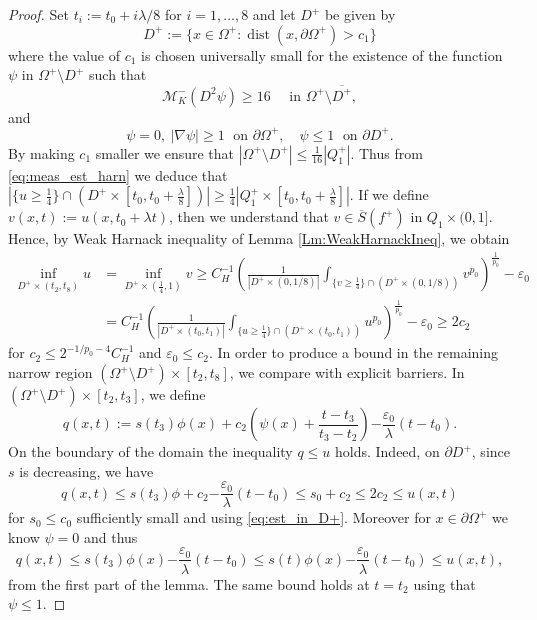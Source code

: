 \documentclass[12pt]{article}
\numberwithin{Theorem}{section}
\theoremstyle{definition}
\theoremstyle{remark}
\numberwithin{equation}{section}
\newcommand{\p}{\partial}
\newcommand{\eps}{\varepsilon}
\begin{document}
\begin{proof}
Set \(t_i:=t_0+i\lambda/8\) for \(i=1,\dots,8\) and let $D^+$ be given by  
\[ 
D^+:= \{ x \in \Omega^+ : \operatorname{dist}(x,\p \Omega^+) > c_1\} 
\]
 where the value of $c_1$ is chosen universally small for the existence of the function $\psi$ in $\Omega^+ \setminus D^+$ such that 
 \[
    \mathcal M_K^- (D^2 \psi) \geq 16 \quad \text{ in }\Omega^+ \setminus \overline{D^+}, 
 \]
and
\[
\psi= 0, \ |\nabla \psi| \geq 1 \; \text{ on } \p \Omega^+, \quad \psi\leq 1 \; \text{ on } \p D^+.
\]
 By making $c_1$ smaller we ensure that $|\Omega^+\setminus D^+| \leq \frac{1}{16}|Q_1^+|$. Thus from \eqref{eq:meas_est_harn} we deduce that $\left|\{ u \geq \frac{1}{4}\}\cap ( D^+  \times \left[t_0, t_0+\frac{\lambda}{8} \right] ) \right| \geq \frac{1}{4} \left| Q_1^+ \times \left[t_0, t_0+\frac{\lambda}{8} \right] \right|$. 
If we define $v(x,t):=u(x,t_0+\lambda t)$, then we understand that $v \in \overline{S}(f^+)$ in $Q_1 \times (0,1]$. Hence, by Weak Harnack inequality of Lemma \ref{Lm:WeakHarnackIneq}, we obtain
\begin{equation} \label{eq:est_in_D+}
\begin{aligned}
    \inf_{D^+ \times (t_2,t_8)} u &=   \inf_{D^+ \times (\frac{1}{4},1)} v \geq C_H^{-1} \left(\frac{1}{|D^+\times(0,1/8)|} \int_{\{ v \geq \frac{1}{4}\} \cap  \left(D^+\times(0,1/8) \right)} v^{p_0}\right)^\frac{1}{p_0} -\eps_0\\ &=C_H^{-1} \left(\frac{1}{|D^+\times(t_0,t_1)|}\int_{\{ u \geq \frac{1}{4}\} \cap  \left(D^+ \times(t_0,t_1) \right)} u^{p_0}\right)^\frac{1}{p_0} -\eps_0 \geq 2c_2
    \end{aligned}
    \end{equation}
for $c_2 \leq 2^{-1/p_0-4}C_H^{-1}$ and $\eps_0\leq c_2$. In order to produce a bound in the remaining narrow region $(\Omega^+ \setminus D^+) \times [t_2,t_8]$, we compare with explicit barriers. In  $(\Omega^+ \setminus D^+) \times [t_2,t_3]$, we define
\[
q(x,t):= s(t_3) \phi(x) + c_2 \left( \psi(x) + \frac{t-t_3}{t_3-t_2}\right) {-\frac{\eps_0}{\lambda}(t-t_0)}.  
\]
On the boundary of the domain the inequality $q \leq u$ holds. Indeed, on $\p D^+$, since $s$ is decreasing, we have 
\[
q(x,t) \leq s(t_3) \phi + c_2 {-\frac{\eps_0}{\lambda}(t-t_0)}\leq s_0+c_2 \leq 2c_2 \leq u(x,t)
\]
for $s_0 \leq c_0$ sufficiently small and using \eqref{eq:est_in_D+}. Moreover for $x \in \p \Omega^+$ we know $\psi = 0$ and thus
\[
q(x,t) \leq s(t_3) \phi(x)  {-\frac{\eps_0}{\lambda}(t-t_0)} \leq s(t) \phi(x) {-\frac{\eps_0}{\lambda}(t-t_0)}\leq u(x,t),
\]
from the first part of the lemma. The same bound holds at $t=t_2$ using that $\psi \leq 1$.

\end{proof}
\end{document}
